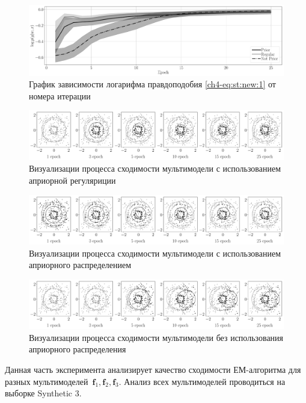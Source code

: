 \begin{figure}[h!t]\center
\includegraphics[width=1\textwidth]{results/priorexpert/experiment_synt_likelihood_progress}
\caption{График зависимости логарифма правдоподобия \eqref{ch4-eq:st:new:1} от номера итерации}
\label{ch4-experiment:st:2:2}
\end{figure}

\begin{figure}[h!t]\center
\includegraphics[width=1\textwidth]{results/priorexpert/experiment_synt_regular_progress}
\caption{Визуализации процесса сходимости мультимодели с использованием априорной регуляриции}
\label{ch4-experiment:st:2:3}
\end{figure}

\begin{figure}[h!t]\center
\includegraphics[width=1\textwidth]{results/priorexpert/experiment_synt_prior_progress}
\caption{Визуализации процесса сходимости мультимодели с использованием априорного распределением}
\label{ch4-experiment:st:2:4}
\end{figure}

\begin{figure}[h!t]\center
\includegraphics[width=1\textwidth]{results/priorexpert/experiment_synt_not_prior_progress}
\caption{Визуализации процесса сходимости мультимодели без использования априорного распределения}
\label{ch4-experiment:st:2:5}
\end{figure}
Данная часть эксперимента анализирует качество сходимости ЕМ-алгоритма для разных мультимоделей~$\textbf{f}_1, \textbf{f}_2, \textbf{f}_3$.
Анализ всех мультимоделей проводиться на выборке Synthetic 3.

